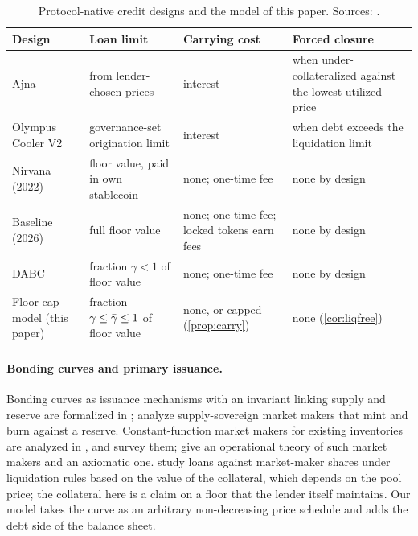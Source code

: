 \begin{table}[t]
\centering\small
\caption{Protocol-native credit designs and the model of this paper. Sources: \citep{nethermindcooler,ajna,nirvanadocs,baselinedocs,dabc2026}.}\label{tab:class}
\begin{tabularx}{\textwidth}{@{}l>{\raggedright\arraybackslash}X>{\raggedright\arraybackslash}X>{\raggedright\arraybackslash}X@{}}
\toprule
Design & Loan limit & Carrying cost & Forced closure\\
\midrule
Ajna & from lender-chosen prices & interest & when under-collateralized against the lowest utilized price\\
Olympus Cooler V2 & governance-set origination limit & interest & when debt exceeds the liquidation limit\\
Nirvana (2022) & floor value, paid in own stablecoin & none; one-time fee & none by design\\
Baseline (2026) & full floor value & none; one-time fee; locked tokens earn fees & none by design\\
DABC \citep{dabc2026} & fraction $\gamma<1$ of floor value & none; one-time fee & none by design\\
Floor-cap model (this paper) & fraction $\gamma\le\bar\gamma\le1$ of floor value & none, or capped (\cref{prop:carry}) & none (\cref{cor:liqfree})\\
\bottomrule
\end{tabularx}
\end{table}

\paragraph{Bonding curves and primary issuance.} Bonding curves as issuance mechanisms with an invariant linking supply and reserve are formalized in \citep{zargham2020}; \citet{kirste2025} analyze supply-sovereign market makers that mint and burn against a reserve. Constant-function market makers for existing inventories are analyzed in \citep{angeris2020uniswap}, and \citet{xu2023sok} survey them; \citet{bartoletti2022amm} give an operational theory of such market makers and \citet{bichuch2026} an axiomatic one.  study loans against market-maker shares under liquidation rules based on the value of the collateral, which depends on the pool price; the collateral here is a claim on a floor that the lender itself maintains. Our model takes the curve as an arbitrary non-decreasing price schedule and adds the debt side of the balance sheet.

